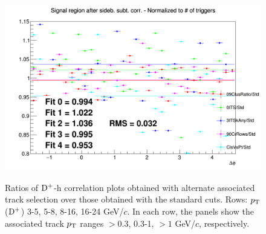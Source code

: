 \begin{figure}
{\includegraphics[width=0.31\linewidth]{figures/Systematics/Dplus/TrackCut/Ratio_AzimCorrDistr_Dplus_Canvas_PtIntBins13to13_PoolInt_thr1dotto99dot.png}} \\
 \caption{Ratios of ${\rm D^+}$-h correlation plots obtained with alternate associated track selection over those obtained with the standard cuts. Rows: $p_{\rm T}$(${\rm D^+}$) 3-5, 5-8, 8-16, 16-24 GeV/$c$. In each row, the panels show the associated track
$p_{\rm T}$ ranges $> 0.3$, 0.3-1, $> 1$ GeV/$c$, respectively.}
\label{fig:SysTrEff020_Dplus}
\end{figure}


